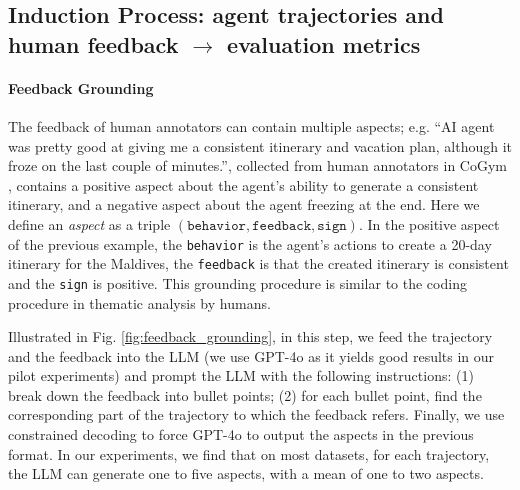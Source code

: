 

\subsection{Induction Process: agent trajectories and human feedback $\rightarrow$ evaluation metrics}
\label{sec:induction_process}

\paragraph{Feedback Grounding}
The feedback of human annotators can contain multiple aspects; e.g. \textsf{``AI agent was pretty good
at giving me a consistent itinerary and vacation plan, although it froze on the last couple of minutes.''},
collected from human annotators in CoGym \citep{shao2024collaborative}, contains a positive aspect
about the agent's ability to generate a consistent itinerary, and a negative aspect about the agent freezing
at the end. Here we define an \emph{aspect} as a triple $(\texttt{behavior}, \texttt{feedback}, \texttt{sign})$.
In the positive aspect of the previous example, the \texttt{behavior} is the agent's actions to create
a 20-day itinerary for the Maldives, the \texttt{feedback} is that the created itinerary is consistent and the \texttt{sign} is positive. This grounding procedure is similar to the coding procedure in thematic analysis by humans.



Illustrated in Fig. \ref{fig:feedback_grounding}, in this step, we feed the trajectory and the feedback into the LLM (we use GPT-4o \citep{openai2024gpt4ocard} 
as it yields good results in our pilot experiments) and prompt the LLM with the following instructions:
(1) break down the feedback into bullet points; (2) for each bullet point, find the corresponding
part of the trajectory to which the feedback refers. Finally, we use constrained decoding to force GPT-4o
to output the aspects in the previous format. In our experiments, we find that on most datasets, for each
trajectory, the LLM can generate one to five aspects, with a mean of one to two aspects.


